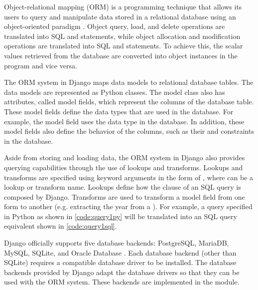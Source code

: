 Object-relational mapping (ORM) is a programming technique that allows its
users to query and manipulate data stored in a relational database using an
object-oriented paradigm \cite{linskey:orm}. Object query, load, and delete
operations are translated into SQL  and  statements,
while object allocation and modification operations are translated into SQL
 and  statements. To achieve this, the scalar values
retrieved from the database are converted into object instances in the program
and vice versa.

The ORM system in Django maps data models to relational database tables. The
data models are represented as Python classes. The model class also has
attributes, called model fields, which represent the columns of the database
table. These model fields define the data types that are used in the database.
For example, the  model field uses the  data type
in the database. In addition, these model fields also define the behavior of
the columns, such as their  and  constraints in the
database.





Aside from storing and loading data, the ORM system in Django also provides
querying capabilities through the use of lookups and transforms. Lookups and
transforms are specified using keyword arguments in the form of
, where  can be a lookup or
transform name. Lookups define how the  clause of an SQL query is
composed by Django. Transforms are used to transform a model field from one
form to another (e.g. extracting the year from a ). For
example, a query specified in Python as shown in \autoref{code:query1py} will
be translated into an SQL query equivalent shown in \autoref{code:query1sql}.

Django officially supports five database backends: PostgreSQL, MariaDB, MySQL,
SQLite, and Oracle Database \cite{django:databases}. Each database backend
(other than SQLite) requires a compatible database driver to be installed. The
database backends provided by Django adapt the database drivers so that they
can be used with the ORM system. These backends are implemented in the
 module.

